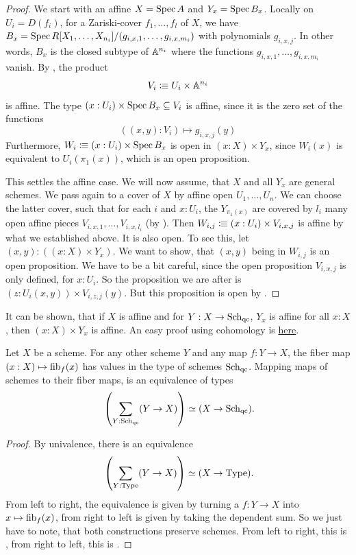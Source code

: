 \begin{proof}
  We start with an affine $X=\operatorname{Spec} A$ and $Y_x=\operatorname{Spec} B_x$.
  Locally on $U_i = D(f_i)$, for a Zariski-cover $f_1,\dots,f_l$ of $X$,
  we have $B_x=\operatorname{Spec} R[X_1,\dots,X_{n_i}]/(g_{i,x,1},\dots,g_{i,x,m_i})$
  with polynomials $g_{i,x,j}$.
  In other words, $B_x$ is the closed subtype of $\mathbb{A}^{n_i}$
  where the functions $g_{i,x,1},\dots,g_{i,x,m_i}$ vanish.
  By , the product
  \[ V_i\vcentcolon\mspace{-1.2mu}\equiv U_i\times \mathbb{A}^{n_i}\]
  is affine.
  The type $(x:U_i)\times \operatorname{Spec} B_x\subseteq V_i$ is affine,
  since it is the zero set of the functions
  \[ ((x,y):V_i)\mapsto g_{i,x,j}(y) \]
  Furthermore, $W_i\vcentcolon\mspace{-1.2mu}\equiv (x:U_i)\times \operatorname{Spec} B_x$
  is open in $(x:X)\times Y_x$,
  since $W_i(x)$ is equivalent to $U_i(\pi_1(x))$,
  which is an open proposition.

  This settles the affine case.
  We will now assume, that
  $X$ and all $Y_x$ are general schemes.
  We pass again to a cover of $X$ by affine open $U_1,\dots,U_n$.
  We can choose the latter cover,
  such that for each $i$ and $x:U_i$, the $Y_{\pi_1(x)}$
  are covered by $l_i$ many open affine pieces $V_{i,x,1},\dots,V_{i,x,l_i}$
  (by ).
  Then $W_{i,j}\vcentcolon\mspace{-1.2mu}\equiv(x:U_i)\times V_{i,x,j}$ is affine by what we established above.
  It is also open.
  To see this, let $(x,y):((x:X)\times Y_x)$.
  We want to show, that $(x,y)$ being in $W_{i,j}$ is an open proposition.
  We have to be a bit careful, since the open proposition
  $V_{i,x,j}$ is only defined, for $x:U_i$.
  So the proposition we are after is $(z:U_i(x,y))\times V_{i,z,j}(y)$.
  But this proposition is open by .
\end{proof}

It can be shown, that if $X$ is affine and for $Y:X\to\operatorname{\mathrm{Sch}_{qc}}$,
$Y_x$ is affine for all $x:X$,
then $(x:X)\times Y_x$ is affine.
An easy proof using cohomology is \href{https://felix-cherubini.de/random.pdf}{here}. 

\begin{corollary}
  \label{scheme-map-classification}
  Let $X$ be a scheme.
  For any other scheme $Y$ and any map $f:Y\to X$,
  the fiber map
  $(x:X)\mapsto \mathrm{fib}_f(x)$
  has values in the type of schemes $\operatorname{\mathrm{Sch}_{qc}}$.
  Mapping maps of schemes to their fiber maps,
  is an equivalence of types
  \[ \left(\sum_{Y:\Sch}(Y\to X)\right)\simeq (X\to \Sch)\rlap{.}\]
\end{corollary}

\begin{proof}
  By univalence, there is an equivalence
  \[ \left(\sum_{Y:\Type}(Y\to X)\right)\simeq (X\to \Type)\rlap{.} \]
  From left to right, the equivalence is given by turning a $f:Y\to X$ into $x\mapsto \mathrm{fib}_f(x)$,
  from right to left is given by taking the dependent sum.
  So we just have to note, that both constructions preserve schemes.
  From left to right, this is , from right to left,
  this is .
\end{proof}


